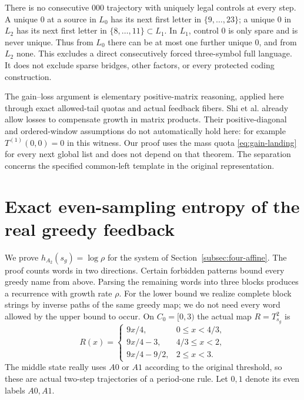 \documentclass[11pt,reqno]{amsart}
\numberwithin{equation}{section}
\theoremstyle{definition}
\theoremstyle{definition}
\begin{document}
There is no consecutive $000$ trajectory with uniquely legal
controls at every step. A unique $0$ at a source in $L_0$ has its
next first letter in $\{9,\ldots,23\}$; a unique $0$ in $L_2$
has its next first letter in $\{8,\ldots,11\}\subset L_1$.
In $L_1$, control $0$ is only spare and is never unique.
Thus from $L_0$ there can be at most one further unique $0$,
and from $L_2$ none. This excludes a direct consecutively forced
three-symbol full language. It does not exclude sparse bridges,
other factors, or every protected coding construction.

The gain--loss argument is elementary positive-matrix reasoning,
applied here through exact allowed-tail quotas and actual feedback
fibers. Shi et al. \cite[Definition~2.5 and Theorems~2.6, 2.8,
pp.~8--11 of arXiv:2004.01867v2]{Shi2021}
already allow losses to compensate growth in matrix products.
Their positive-diagonal and ordered-window assumptions do not
automatically hold here: for example $T^{(1)}(0,0)=0$ in this
witness. Our proof uses the mass quota
\eqref{eq:gain-landing} for every next global list and does not
depend on that theorem. The separation concerns the specified common-left template in the
original representation.


\section{Exact even-sampling entropy of the real greedy feedback}
\label{app:greedy}

We prove $h_{A_2}(s_g)=\log\rho$ for the system of
Section~\ref{subsec:four-affine}. The proof counts words in two
directions. Certain forbidden patterns bound every greedy name from
above. Parsing the remaining words into three blocks produces a
recurrence with growth rate $\rho$. For the lower bound we realize
complete block strings by inverse paths of the same greedy map;
we do not need every word allowed by the upper bound to occur.
On $C_0=[0,3)$ the actual map $R=T_{s_g}^2$ is
\begin{equation}\label{eq:greedy-R}
 R(x)=\begin{cases}
 9x/4,&0\le x<4/3,\\
 9x/4-3,&4/3\le x<2,\\
 9x/4-9/2,&2\le x<3.
 \end{cases}
\end{equation}
The middle state really uses $A0$ or $A1$ according to the original
threshold, so these are actual two-step trajectories of a period-one
rule. Let $0,1$ denote its even labels $A0,A1$.
\end{document}
